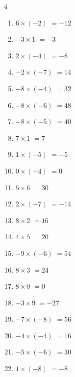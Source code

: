 \begin{multicols}{4}
\begin{enumerate}
  \item $6\times (-2)$
        $=-12$

  \item $-3\times 1$
        $=-3$

  \item $2\times (-4)$
        $=-8$

  \item $-2\times (-7)$
        $=14$

  \item $-8\times (-4)$
        $=32$

  \item $-8\times (-6)$
        $=48$

  \item $-8\times (-5)$
        $=40$

  \item $7\times 1$
        $=7$

  \item $1\times (-5)$
        $=-5$

  \item $0\times (-4)$
        $=0$

  \item $5\times 6$
        $=30$

  \item $2\times (-7)$
        $=-14$

  \item $8\times 2$
        $=16$

  \item $4\times 5$
        $=20$

  \item $-9\times (-6)$
        $=54$

  \item $8\times 3$
        $=24$

  \item $8\times 0$
        $=0$

  \item $-3\times 9$
        $=-27$

  \item $-7\times (-8)$
        $=56$

  \item $-4\times (-4)$
        $=16$

  \item $-5\times (-6)$
        $=30$

\columnbreak %

  \item $1\times (-8)$
        $=-8$


\end{enumerate}
\end{multicols}
